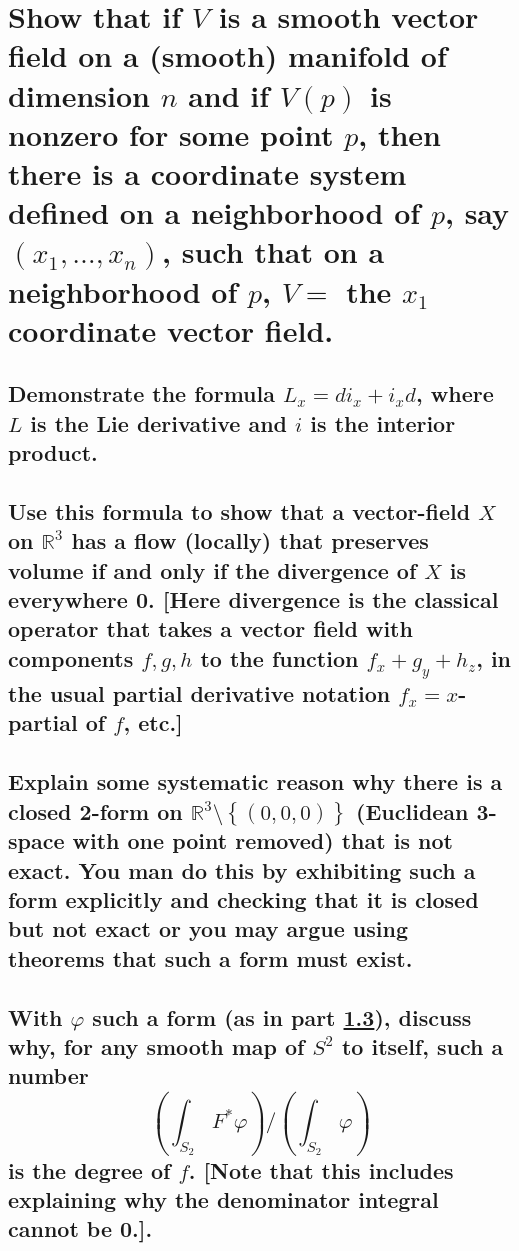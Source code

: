 \documentclass[10pt]{article}
\begin{document}
 

\section{Show that if $V$ is a smooth vector field on a (smooth) manifold of dimension $n$ and if
  $V(p)$ is nonzero for some point $p$, then there is a coordinate system defined on a neighborhood
  of $p$, say $(x_1, \dots, x_n)$, such that on a neighborhood of $p$, $V =$ the $x_1$ coordinate
  vector field.}

\advsection{}

\subsection{Demonstrate the formula $L_x = di_x + i_x d$, where $L$ is the Lie derivative and $i$ is
  the interior product.}

\subsection{Use this formula to show that a vector-field $X$ on $\mathbb{R}^3$ has a flow (locally)
  that preserves volume if and only if the divergence of $X$ is everywhere 0. [Here divergence is
  the classical operator that takes a vector field with components $f,g,h$ to the function $f_x +
  g_y + h_z$, in the usual partial derivative notation $f_x = x$-partial of $f$, etc.]}

\advsection{}

\subsection{Explain some systematic reason why there is a closed 2-form on $\mathbb{R}^3 \setminus
  \left\{ (0,0,0) \right\} $ (Euclidean 3-space with one point removed) that is not exact. You man
  do this by exhibiting such a form explicitly and checking that it is closed but not exact or you
  may argue using theorems that such a form must exist.}
\label{above}

\subsection{With $\varphi$ such a form (as in part \ref{above}), discuss why, for any smooth map of
  $S^2$ to itself, such a number
  $$\left(\int_{S_2} F^* \varphi\right) / \left(\int_{S_2}\varphi  \right)$$
  is the degree of $f$. [Note that this includes explaining why the denominator integral cannot be 0.].}
\end{document}
